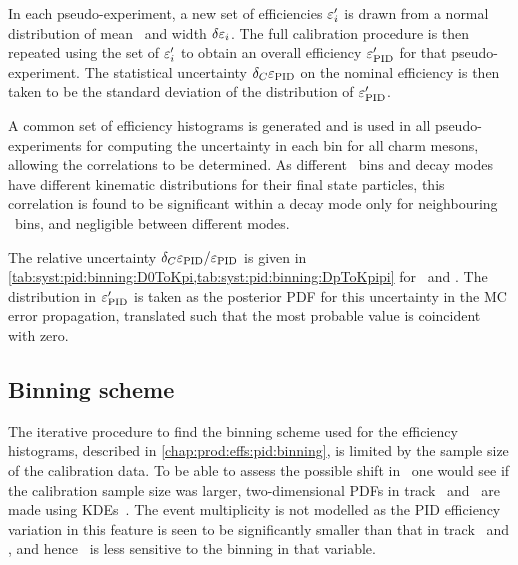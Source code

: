 In each pseudo-experiment, a new set of efficiencies $\varepsilon_{i}'$ is drawn from a 
normal distribution of mean \effi\ and width $\delta{\ensuremath{\varepsilon_{i}}}$.
The full calibration procedure is then repeated using the set of $\varepsilon_{i}'$ to 
obtain an overall efficiency $\varepsilon_{\textnormal{PID}}'$ for that pseudo-experiment.
The statistical uncertainty $\delta_{C}{\varepsilon_{\textnormal{PID}}}$ on the nominal efficiency is 
then taken to be the standard deviation of the distribution of $\varepsilon_{\textnormal{PID}}'$.

A common set of efficiency histograms is generated and is used in all 
pseudo-experiments for computing the uncertainty in each bin for all charm 
mesons, allowing the correlations to be determined.
As different \pTy\ bins and decay modes have different kinematic distributions 
for their final state particles, this correlation is found to be significant 
within a decay mode only for neighbouring \pTy\ bins, and negligible between 
different modes.

The relative uncertainty $\delta_{C}{\varepsilon_{\textnormal{PID}}}/\varepsilon_{\textnormal{PID}}$ is given in 
\cref{tab:syst:pid:binning:D0ToKpi,tab:syst:pid:binning:DpToKpipi} for 
\DzToKpi\ and \DpToKpipi.
The distribution in $\varepsilon_{\textnormal{PID}}'$ is taken as the posterior \ac{PDF} for this 
uncertainty in the \ac{MC} error propagation, translated such that the most 
probable value is coincident with zero.

\subsection{Binning scheme}
\label{chap:prod:syst:pid:binning}

The iterative procedure to find the binning scheme used for the efficiency 
histograms, described in \cref{chap:prod:effs:pid:binning}, is limited by the 
sample size of the calibration data.
To be able to assess the possible shift in \effpid\ one would see if the 
calibration sample size was larger, two-dimensional \acp{PDF} in track \ptot\ 
and \Eta\ are made using \acp{KDE}~\cite{Poluektov:2014rxa}.
The event multiplicity is not modelled as the \ac{PID} efficiency variation in 
this feature is seen to be significantly smaller than that in track \ptot\ and 
\Eta, and hence \effpid\ is less sensitive to the binning in that variable.


